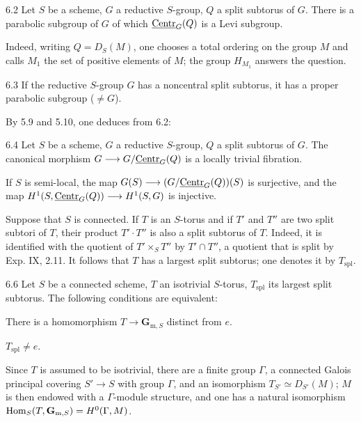 \begin{corollary}{6.2}\label{XXVI.6.2}
Let $S$ be a scheme, $G$ a reductive $S$-group, $Q$ a split subtorus of $G$. There is a parabolic subgroup of $G$ of which $\underline{\mathrm{Centr}}_G(Q)$ is a Levi subgroup.
\end{corollary}
Indeed, writing $Q=D_S(M)$, one chooses a total ordering on the group $M$ and calls $M_1$ the set of positive elements of $M$; the group $H_{M_1}$ answers the question.

\begin{corollary}{6.3}\label{XXVI.6.3}
If the reductive $S$-group $G$ has a noncentral split subtorus, it has a proper parabolic subgroup (\ie $\neq G$).
\end{corollary}
By 5.9 and 5.10, one deduces from 6.2:
\begin{corollary}{6.4}\label{XXVI.6.4}
Let $S$ be a scheme, $G$ a reductive $S$-group, $Q$ a split subtorus of $G$. The canonical morphism $G\longrightarrow G/\underline{\mathrm{Centr}}_G(Q)$ is a locally trivial fibration.

If $S$ is semi-local, the map $G(S)\longrightarrow(G/\underline{\mathrm{Centr}}_G(Q))(S)$ is surjective, and the map $H^1(S,\underline{\mathrm{Centr}}_G(Q))\longrightarrow H^1(S,G)$ is injective.
\end{corollary}

\label{XXVI.6.5}
Suppose that $S$ is connected. If $T$ is an $S$-torus and if $T'$ and $T''$ are two split subtori of $T$, their product $T'\cdot T''$ is also a split subtorus of $T$. Indeed, it is identified with the quotient of $T'\times_S T''$ by $T'\cap T''$, a quotient that is split by Exp. IX, 2.11. It follows that $T$ has a largest split subtorus; one denotes it by $T_{\mathrm{spl}}$.

\begin{lemma}{6.6}\label{XXVI.6.6}
Let $S$ be a connected scheme, $T$ an isotrivial $S$-torus, $T_{\mathrm{spl}}$ its largest split subtorus. The following conditions are equivalent:
\begin{enumeratei}
\item There is a homomorphism $T\to\mathbf{G}_{\mathrm m,S}$ distinct from $e$.
\item $T_{\mathrm{spl}}\neq e$.
\end{enumeratei}
\end{lemma}
Since $T$ is assumed to be isotrivial, there are a finite group $\Gamma$, a connected Galois principal covering $S'\to S$ with group $\Gamma$, and an isomorphism $T_{S'}\simeq D_{S'}(M)$; $M$ is then endowed with a $\Gamma$-module structure, and one has a natural isomorphism $\operatorname{Hom}_S(T,\mathbf{G}_{\mathrm m,S})=H^0(\Gamma,M)$.

